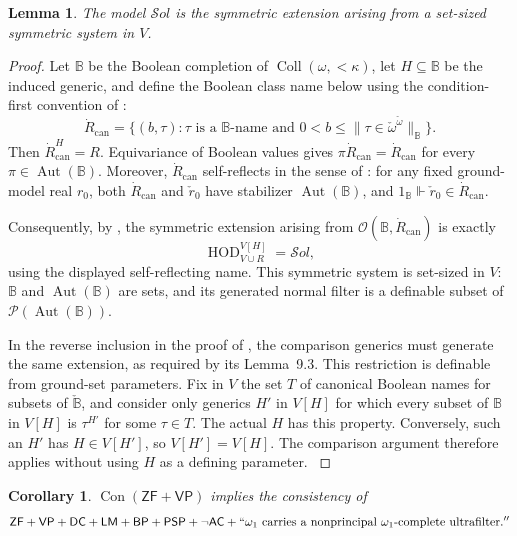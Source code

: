 \documentclass[11pt,a4paper]{amsart}
\newcommand{\VP}{\mathsf{VP}}
\newcommand{\AC}{\mathsf{AC}}
\newcommand{\ZF}{\mathsf{ZF}}
\newcommand{\Con}{\operatorname{Con}}
\newcommand{\HOD}{\operatorname{HOD}}
\newcommand{\Coll}{\operatorname{Coll}}
\newcommand{\Aut}{\operatorname{Aut}}
\newcommand{\DC}{\mathsf{DC}}
\newcommand{\LM}{\mathsf{LM}}
\newcommand{\BP}{\mathsf{BP}}
\newcommand{\PSP}{\mathsf{PSP}}
\theoremstyle{plain}
\newtheorem{lemma}[theorem]{Lemma}
\newtheorem{corollary}[theorem]{Corollary}
\theoremstyle{definition}
\theoremstyle{remark}
\begin{document}
\begin{lemma}\label{lem:Solovay-symmetric}
The model $\mathcal S\!ol$ is the symmetric extension arising from a set-sized symmetric system in $V$.
\end{lemma}

\begin{proof}
Let $\mathbb B$ be the Boolean completion of ${\Coll}(\omega,{<}\kappa)$, let $H\subseteq\mathbb B$ be the induced generic, and define the Boolean class name below using the condition-first convention of \cite{KaragilaSchilhan}:
\[
\dot R_{\mathrm{can}}=
\{(b,\tau):\tau\text{ is a }\mathbb B\text{-name and }
0<b\leq\|\tau\in\check\omega^{\check\omega}\|_{\mathbb B}\}.
\]
Then $\dot R_{\mathrm{can}}^H=R$.  Equivariance of Boolean values gives
$\pi\dot R_{\mathrm{can}}=\dot R_{\mathrm{can}}$ for every
$\pi\in\Aut(\mathbb B)$.  Moreover, $\dot R_{\mathrm{can}}$ self-reflects in the sense of \cite[Definitions~9.1--9.2]{KaragilaSchilhan}: for any fixed ground-model real $r_0$, both $\dot R_{\mathrm{can}}$ and $\check r_0$ have stabilizer $\Aut(\mathbb B)$, and
$1_{\mathbb B}\Vdash\check r_0\in\dot R_{\mathrm{can}}$.

Consequently, by \cite[Proposition~9.4]{KaragilaSchilhan}, the symmetric extension arising from
$\mathcal O(\mathbb B,\dot R_{\mathrm{can}})$ is exactly
\[
\HOD_{V\cup R}^{V[H]}=\mathcal S\!ol,
\]
using the displayed self-reflecting name.  This symmetric system is set-sized in $V$: $\mathbb B$ and $\Aut(\mathbb B)$ are sets, and its generated normal filter is a definable subset of
$\mathcal P(\Aut(\mathbb B))$.

{\color{auditgreen}
In the reverse inclusion in the proof of \cite[Proposition~9.4]{KaragilaSchilhan}, the comparison generics must generate the same extension, as required by its Lemma~9.3.  This restriction is definable from ground-set parameters.  Fix in $V$ the set $T$ of canonical Boolean names for subsets of $\check{\mathbb B}$, and consider only generics $H'$ in $V[H]$ for which every subset of $\mathbb B$ in $V[H]$ is $\tau^{H'}$ for some $\tau\in T$.  The actual $H$ has this property.  Conversely, such an $H'$ has $H\in V[H']$, so $V[H']=V[H]$.  The comparison argument therefore applies without using $H$ as a defining parameter.
}
\end{proof}

\begin{corollary}\label{cor:Solovay}
$\Con(\ZF+\VP)$ implies the consistency of
\[
\ZF+\VP+\DC+\LM+\BP+\PSP+\neg\AC+
``\omega_1\text{ carries a nonprincipal }\omega_1\text{-complete ultrafilter}.''
\]
\end{corollary}
\end{document}
